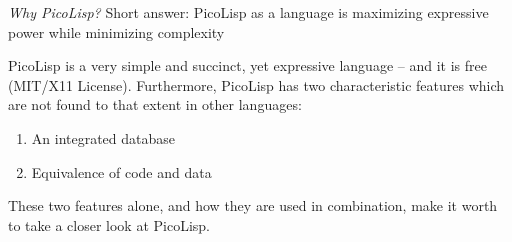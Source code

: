 %
%

\preface






\emph{Why PicoLisp?} Short answer: PicoLisp as a language is
maximizing expressive power while minimizing complexity

PicoLisp is a very simple and succinct, yet expressive language -- and
it is free (MIT/X11 License). Furthermore, PicoLisp has two
characteristic features which are not found to that extent in other
languages:

\begin{enumerate}
\item
  An integrated database
\item
  Equivalence of code and data
\end{enumerate}

These two features alone, and how they are used in combination, make
it worth to take a closer look at PicoLisp.

